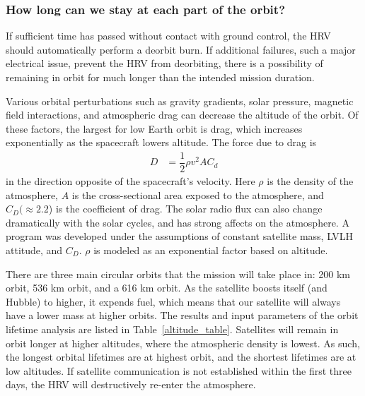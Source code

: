 \documentclass[paper=letter, fontsize=11pt]{scrartcl} %
\numberwithin{equation}{section} %
\numberwithin{figure}{section} %
\numberwithin{table}{section} %
\begin{document}
\subsubsection{How long can we stay at each part of the orbit?} \label{howlong}

If sufficient time has passed without contact with ground control, the HRV should automatically perform a deorbit burn. If additional failures, such a major electrical issue, prevent the HRV from deorbiting, there is a possibility of remaining in orbit for much longer than the intended mission duration.

Various orbital perturbations such as gravity gradients, solar pressure, magnetic field interactions, and atmospheric drag can decrease the altitude of the orbit. Of these factors, the largest for low Earth orbit is drag, which increases exponentially as the spacecraft lowers altitude. The force due to drag is
\begin{align*}
    D & = \dfrac{1}{2} \rho v^2 A C_d
\end{align*}
in the direction opposite of the spacecraft's velocity. Here $\rho$ is the density of the atmosphere, $A$ is the cross-sectional area exposed to the atmosphere, and $C_D (\approx 2.2$) is the coefficient of drag. The solar radio flux can also change dramatically with the solar cycles, and has strong affects on the atmosphere. A program was developed under the assumptions of constant satellite mass, LVLH attitude, and $C_D$. $\rho$ is modeled as an exponential factor based on altitude.

There are three main circular orbits that the mission will take place in: 200 km orbit, 536 km orbit, and a 616 km orbit. As the satellite boosts itself (and Hubble) to higher, it expends fuel, which means that our satellite will always have a lower mass at higher orbits. The results and input parameters of the orbit lifetime analysis are listed in Table~\ref{altitude_table}. Satellites will remain in orbit longer at higher altitudes, where the atmospheric density is lowest. As such, the longest orbital lifetimes are at highest orbit, and the shortest lifetimes are at low altitudes. If satellite communication is not established within the first three days, the HRV will destructively re-enter the atmosphere.

\end{document}
